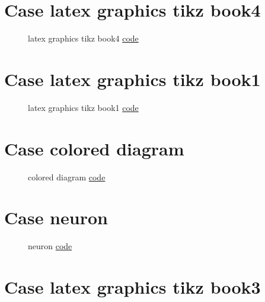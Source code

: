 \documentclass{article}
\begin{document}
\section{Case latex graphics tikz book4}

\begin{figure}[H]
	\centering
	
	\caption{latex graphics tikz book4 \href{https:/github.com/cauliyang/learn_tikz/blob/main/source/latex_graphics_tikz_book4.tex}{code} }
	\label{fig:latex graphics tikz book4}
\end{figure}

\section{Case latex graphics tikz book1}

\begin{figure}[H]
	\centering
	
	\caption{latex graphics tikz book1 \href{https:/github.com/cauliyang/learn_tikz/blob/main/source/latex_graphics_tikz_book1.tex}{code} }
	\label{fig:latex graphics tikz book1}
\end{figure}

\section{Case colored diagram}

\begin{figure}[H]
	\centering
	
	\caption{colored diagram \href{https:/github.com/cauliyang/learn_tikz/blob/main/source/colored_diagram.tex}{code} }
	\label{fig:colored diagram}
\end{figure}

\section{Case neuron}

\begin{figure}[H]
	\centering
	
	\caption{neuron \href{https:/github.com/cauliyang/learn_tikz/blob/main/source/neuron.tex}{code} }
	\label{fig:neuron}
\end{figure}

\section{Case latex graphics tikz book3}
\end{document}
